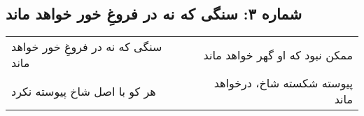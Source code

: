 \begin{center}
\section*{شماره ۳: سنگی که نه در فروغِ خور خواهد ماند}
\label{sec:003}
\begin{longtable}{l p{0.5cm} r}
سنگی که نه در فروغِ خور خواهد ماند
&&
ممکن نبود که او گهر خواهد ماند
\\
هر کو با اصل شاخ پیوسته نکرد
&&
پیوسته شکسته شاخ، درخواهد ماند
\\
\end{longtable}
\end{center}
